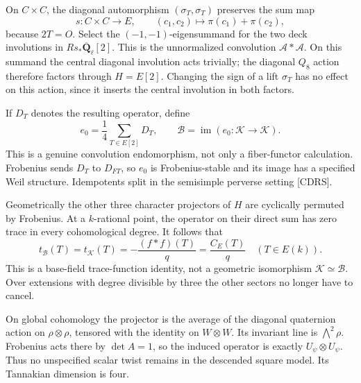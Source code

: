 \documentclass[
  11pt,
  a4paper,
]{article}
\newcommand{\Q}{\overline{\mathbf Q}_{\ell}}
\newcommand{\im}{\operatorname{im}}
\newcommand{\A}{\mathcal A}
\newcommand{\B}{\mathcal B}
\begin{document}
On $C\times C$, the diagonal automorphism $(\sigma_T,\sigma_T)$ preserves the sum map
\begin{equation}
 s:C\times C\longrightarrow E,\qquad(c_1,c_2)\longmapsto\pi(c_1)+\pi(c_2),
\end{equation}
because $2T=O$. Select the $(-1,-1)$-eigensummand for the two deck involutions in $Rs_*\Q[2]$. This is the unnormalized convolution $\A*\A$. On this summand the central diagonal involution acts trivially; the diagonal $Q_8$ action therefore factors through $H=E[2]$. Changing the sign of a lift $\sigma_T$ has no effect on this action, since it inserts the central involution in both factors.

If $D_T$ denotes the resulting operator, define
\begin{equation}\label{eq:projector}
 \boxed{e_0=\frac14\sum_{T\in E[2]}D_T,\qquad
 \B=\im(e_0:\mathcal K\to\mathcal K).}
\end{equation}
This is a genuine convolution endomorphism, not only a fiber-functor calculation. Frobenius sends $D_T$ to $D_{FT}$, so $e_0$ is Frobenius-stable and its image has a specified Weil structure. Idempotents split in the semisimple perverse setting [CDRS].

Geometrically the other three character projectors of $H$ are cyclically permuted by Frobenius. At a $k$-rational point, the operator on their direct sum has zero trace in every cohomological degree. It follows that
\begin{equation}\label{eq:tracefunction}
 \boxed{t_{\B}(T)=t_{\mathcal K}(T)
       =-\frac{(f*f)(T)}q=\frac{C_E(T)}q
       \quad(T\in E(k)).}
\end{equation}
This is a base-field trace-function identity, not a geometric isomorphism $\mathcal K\simeq\B$. Over extensions with degree divisible by three the other sectors no longer have to cancel.

On global cohomology the projector is the average of the diagonal quaternion action on $\rho\otimes\rho$, tensored with the identity on $W\otimes W$. Its invariant line is $\bigwedge^2\rho$. Frobenius acts there by $\det A=1$, so the induced operator is exactly $U_\psi\otimes U_\psi$. Thus no unspecified scalar twist remains in the descended square model. Its Tannakian dimension is four.
\end{document}
